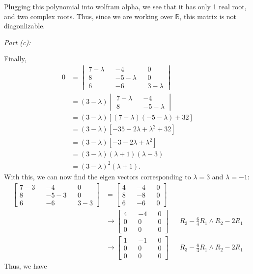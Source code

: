 \documentclass[10pt,a4paper]{article}
\makeatletter
\newcommand{\proofpart}[2]{%
  \par
  \addvspace{\medskipamount}%
  \noindent\emph{Part #1: #2}\par\nobreak
  \addvspace{\smallskipamount}%
  \@afterheading
}
\theoremstyle{definition}
\makeatother
\begin{document}
Plugging this polynomial into wolfram alpha, we see that it has only 1 real root, and two complex roots. Thus, since we are working over $\mathbb{R}$, this matrix is not diagonlizable.
\proofpart{(c)}{} Finally, 
\begin{align*}
0 &= 
\begin{vmatrix}
7 - \lambda && -4 && 0\\
8 && -5 - \lambda && 0\\
6 && -6 && 3 - \lambda
\end{vmatrix}\\ &= (3 - \lambda) \begin{vmatrix}
7 - \lambda && -4\\
8 && -5 - \lambda
\end{vmatrix}\\
&= (3 - \lambda)[(7- \lambda)(-5 - \lambda) + 32]\\
&= (3 - \lambda)[-35 - 2 \lambda + \lambda^2 + 32]\\
&= (3 - \lambda)[-3 -2 \lambda + \lambda^2]\\
&= (3 - \lambda)(\lambda + 1)(\lambda - 3)\\
&= (3 - \lambda)^2(\lambda + 1).
\end{align*}
With this, we can now find the eigen vectors corresponding to $\lambda = 3$ and $\lambda = -1$:
\begin{align*}
\begin{bmatrix}
7 - 3 && -4 && 0\\
8 && -5 - 3 && 0\\
6 && -6 && 3 - 3
\end{bmatrix} &= \begin{bmatrix}
4 && -4 && 0\\
8 && -8 && 0\\
6 && -6 && 0
\end{bmatrix}\\
&\to \begin{bmatrix}
4 && -4 && 0\\
0 && 0 && 0\\
0 && 0 && 0
\end{bmatrix} && R_3 - \frac{6}{4}R_1 \land R_2 - 2R_1\\
&\to \begin{bmatrix}
1 && -1 && 0\\
0 && 0 && 0\\
0 && 0 && 0
\end{bmatrix} && R_3 - \frac{6}{4}R_1 \land R_2 - 2R_1
\end{align*}
Thus, we have
\end{document}
